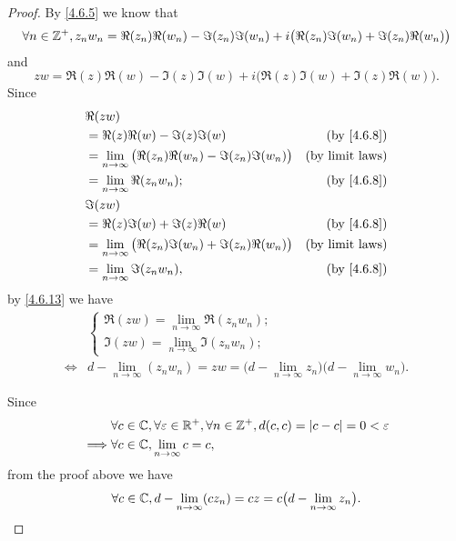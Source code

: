\begin{proof}
  By \cref{4.6.5} we know that
  \[
    \forall n \in \mathbb{Z}^+, z_n w_n = \Re(z_n) \Re(w_n) - \Im(z_n) \Im(w_n) + i \big(\Re(z_n) \Im(w_n) + \Im(z_n) \Re(w_n)\big)
  \]
  and
  \[
    z w = \Re(z) \Re(w) - \Im(z) \Im(w) + i \big(\Re(z) \Im(w) + \Im(z) \Re(w)\big).
  \]
  Since
  \begin{align*}
     & \Re(zw)                                                                                          \\
     & = \Re(z) \Re(w) - \Im(z) \Im(w)                                       & \text{(by \cref{4.6.8})} \\
     & = \lim_{n \to \infty} \big(\Re(z_n) \Re(w_n) - \Im(z_n) \Im(w_n)\big) & \text{(by limit laws)}   \\
     & = \lim_{n \to \infty} \Re(z_n w_n);                                   & \text{(by \cref{4.6.8})} \\
     & \Im(zw)                                                                                          \\
     & = \Re(z) \Im(w) + \Im(z) \Re(w)                                       & \text{(by \cref{4.6.8})} \\
     & = \lim_{n \to \infty} \big(\Re(z_n) \Im(w_n) + \Im(z_n) \Re(w_n)\big) & \text{(by limit laws)}   \\
     & = \lim_{n \to \infty} \Im(z_n w_n),                                   & \text{(by \cref{4.6.8})}
  \end{align*}
  by \cref{4.6.13} we have
  \begin{align*}
         & \begin{cases}
             \Re(zw) = \lim_{n \to \infty} \Re(z_n w_n); \\
             \Im(zw) = \lim_{n \to \infty} \Im(z_n w_n);
           \end{cases}                                                                           \\
    \iff & d - \lim_{n \to \infty} (z_n w_n) = zw = \big(d - \lim_{n \to \infty} z_n\big) \big(d - \lim_{n \to \infty} w_n\big).
  \end{align*}

  Since
  \begin{align*}
             & \forall c \in \mathbb{C}, \forall \varepsilon \in \mathbb{R}^+, \forall n \in \mathbb{Z}^+, d(c, c) = \left\lvert c - c\right\rvert = 0 < \varepsilon \\
    \implies & \forall c \in \mathbb{C}, \lim_{n \to \infty} c = c,
  \end{align*}
  from the proof above we have
  \[
    \forall c \in \mathbb{C}, d - \lim_{n \to \infty} (c z_n) = cz = c \big(d - \lim_{n \to \infty} z_n\big).
  \]


\end{proof}
